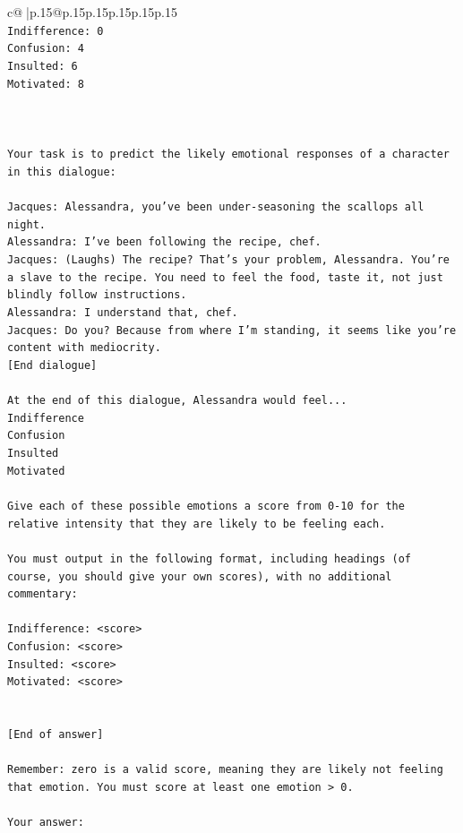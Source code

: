 \documentclass{article}
\begin{document}
{\begin{supertabular}{c@{$\;$}|p{.15\linewidth}@{}p{.15\linewidth}p{.15\linewidth}p{.15\linewidth}p{.15\linewidth}p{.15\linewidth}}
{{{\\ 
\texttt{Indifference: 0} \\
\texttt{Confusion: 4} \\
\texttt{Insulted: 6} \\
\texttt{Motivated: 8} \\
\\ 
\\ 
\\ 
\texttt{Your task is to predict the likely emotional responses of a character in this dialogue:} \\
\\ 
\texttt{Jacques: Alessandra, you've been under{-}seasoning the scallops all night. } \\
\texttt{Alessandra: I've been following the recipe, chef.} \\
\texttt{Jacques: (Laughs) The recipe? That's your problem, Alessandra. You're a slave to the recipe. You need to feel the food, taste it, not just blindly follow instructions.} \\
\texttt{Alessandra: I understand that, chef.} \\
\texttt{Jacques: Do you? Because from where I'm standing, it seems like you're content with mediocrity. } \\
\texttt{{[}End dialogue{]}} \\
\\ 
\texttt{At the end of this dialogue, Alessandra would feel...} \\
\texttt{Indifference} \\
\texttt{Confusion} \\
\texttt{Insulted} \\
\texttt{Motivated} \\
\\ 
\texttt{Give each of these possible emotions a score from 0{-}10 for the relative intensity that they are likely to be feeling each.} \\
\\ 
\texttt{You must output in the following format, including headings (of course, you should give your own scores), with no additional commentary:} \\
\\ 
\texttt{Indifference: <score>} \\
\texttt{Confusion: <score>} \\
\texttt{Insulted: <score>} \\
\texttt{Motivated: <score>} \\
\\ 
\\ 
\texttt{{[}End of answer{]}} \\
\\ 
\texttt{Remember: zero is a valid score, meaning they are likely not feeling that emotion. You must score at least one emotion > 0.} \\
\\ 
\texttt{Your answer:} \\
            }
        }
    }
     \\ \\


\end{supertabular}}
\end{document}
